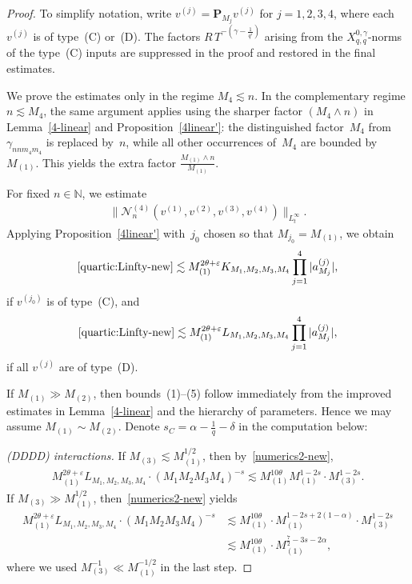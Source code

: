 \documentclass[11pt,reqno,english]{amsart}
\numberwithin{equation}{section}
\theoremstyle{plain}
\theoremstyle{definition}
\theoremstyle{remark}
\newcommand{\N}{\mathbb{N}}
\begin{document}
\begin{proof}
	To simplify notation, write $v^{(j)}=\mathbf{P}_{M_j}v^{(j)}$ for $j=1,2,3,4$, where each~$v^{(j)}$ is of type~(C) or~(D). The factors $R\, T^{-(\gamma-\frac{1}{q'})}$ arising from the $X_{q,q}^{0,\gamma}$-norms of the type~(C) inputs are suppressed in the proof and restored in the final estimates.

	We prove the estimates only in the regime $M_4\lesssim n$. In the complementary regime $n\lesssim M_4$, the same argument applies using the sharper factor $(M_4\wedge n)$ in Lemma~\ref{4-linear} and Proposition~\ref{4linear'}: the distinguished factor~$M_4$ from $\gamma_{nnm_4m_4}$ is replaced by~$n$, while all other occurrences of~$M_4$ are bounded by~$M_{(1)}$. This yields the extra factor $\frac{M_{(1)}\wedge n}{M_{(1)}}$.

	For fixed $n\in\N$, we estimate
	\begin{align}\label{quartic:Linfty-new}
		\|\mathcal{N}_n^{(4)}(v^{(1)},v^{(2)},v^{(3)},v^{(4)})\|_{L_t^{\infty}}.
	\end{align}
	Applying Proposition~\ref{4linear'} with~$j_0$ chosen so that $M_{j_0}=M_{(1)}$, we obtain
	\begin{align}
		\label{numerics1-new}
		\eqref{quartic:Linfty-new}
		\lesssim
		M_{(1)}^{2\theta+\varepsilon}
		K_{M_1,M_2,M_3,M_4}
		\prod_{j=1}^4|a_{M_j}^{(j)}|,
	\end{align}
	if $v^{(j_0)}$ is of type~(C), and
	\begin{align}
		\label{numerics2-new}
		\eqref{quartic:Linfty-new}
		\lesssim
		M_{(1)}^{2\theta+\varepsilon}
		L_{M_1,M_2,M_3,M_4}
		\prod_{j=1}^4|a_{M_j}^{(j)}|,
	\end{align}
	if all $v^{(j)}$ are of type~(D).

	If $M_{(1)}\gg M_{(2)}$, then bounds~(1)--(5) follow immediately from the improved estimates in Lemma~\ref{4-linear} and the hierarchy of parameters. Hence we may assume $M_{(1)}\sim M_{(2)}$.
    Denote $s_C=\alpha-\frac1q-\delta$ in the computation below:
    
    
	\emph{(DDDD) interactions.}
	If $M_{(3)}\lesssim M_{(1)}^{1/2}$, then by~\eqref{numerics2-new},
	\begin{align*}
		M_{(1)}^{2\theta+\varepsilon}
		L_{M_1,M_2,M_3,M_4}
		\cdot (M_1 M_2 M_3 M_4)^{-s}
		\lesssim
		M_{(1)}^{10\theta}
		M_{(1)}^{1-2s}\cdot M_{(3)}^{1-2s}.
	\end{align*}
	If $M_{(3)}\gg M_{(1)}^{1/2}$, then~\eqref{numerics2-new} yields
	\begin{align*}
		M_{(1)}^{2\theta+\varepsilon}
		L_{M_1,M_2,M_3,M_4}
		\cdot (M_1 M_2 M_3 M_4)^{-s}
		&\lesssim
		M_{(1)}^{10\theta}\cdot M_{(1)}^{1-2s+2(1-\alpha)}\cdot M_{(3)}^{1-2s}\\
		&\lesssim
		M_{(1)}^{10\theta}\cdot M_{(1)}^{\frac72-3s-2\alpha},
	\end{align*}
	where we used $M_{(3)}^{-1}\ll M_{(1)}^{-1/2}$ in the last step.


\end{proof}
\end{document}
